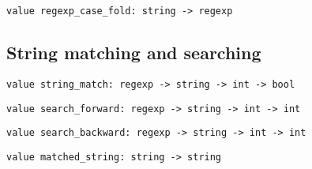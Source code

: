 \begin{verbatim}
value regexp_case_fold: string -> regexp
\end{verbatim}
%
\begin{comment}
 Same as \verbregexp, but the compiled expression will match text
           in a case-insensitive way: uppercase and lowercase letters will
           be considered equivalent. 
\end{comment}
\subsection*{String matching and searching }\begin{verbatim}
value string_match: regexp -> string -> int -> bool
\end{verbatim}
%
\begin{comment}
 \verbstring_match r s start tests whether the characters in \verbs
           starting at position \verbstart match the regular expression \verbr. 
\end{comment}
\begin{verbatim}
value search_forward: regexp -> string -> int -> int
\end{verbatim}
%
\begin{comment}
 \verbsearch_forward r s start searchs the string \verbs for a substring
           matching the regular expression \verbr. The search starts at position
           \verbstart and proceeds towards the end of the string.
           Return the position of the first character of the matched
           substring, or raise \verbNot_found if no substring matches. 
\end{comment}
\begin{verbatim}
value search_backward: regexp -> string -> int -> int
\end{verbatim}
%
\begin{comment}
 Same as \verbsearch_forward, but the search proceeds towards the
           beginning of the string. 
\end{comment}
\begin{verbatim}
value matched_string: string -> string
\end{verbatim}
%
\begin{comment}
 \verbmatched_string s returns the substring of \verbs that was matched
           by the latest \verbstring_match, \verbsearch_forward or \verbsearch_backward.
           The user must make sure that the parameter \verbs is the same string
           that was passed to the matching or searching function. 
\end{comment}
